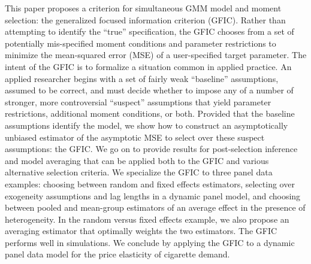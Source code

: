 This paper proposes a criterion for simultaneous GMM model and moment selection: the generalized focused information criterion (GFIC). 
Rather than attempting to identify the ``true'' specification, the GFIC chooses from a set of potentially mis-specified moment conditions and parameter restrictions to minimize the mean-squared error (MSE) of a user-specified target parameter.
The intent of the GFIC is to formalize a situation common in applied practice.
An applied researcher begins with a set of fairly weak ``baseline'' assumptions, assumed to be correct, and must decide whether to impose any of a number of stronger, more controversial ``suspect'' assumptions that yield parameter restrictions, additional moment conditions, or both.
Provided that the baseline assumptions identify the model, we show how to construct an asymptotically unbiased estimator of the asymptotic MSE to select over these suspect assumptions: the GFIC. 
We go on to provide results for post-selection inference and model averaging that can be applied both to the GFIC and various alternative selection criteria.
We specialize the GFIC to three panel data examples: choosing between random and fixed effects estimators, selecting over exogeneity assumptions and lag lengths in a dynamic panel model, and choosing between pooled and mean-group estimators of an average effect in the presence of heterogeneity. 
In the random versus fixed effects example, we also propose an averaging estimator that optimally weights the two estimators.
The GFIC performs well in simulations. 
We conclude by applying the GFIC to a dynamic panel data model for the price elasticity of cigarette demand. 

